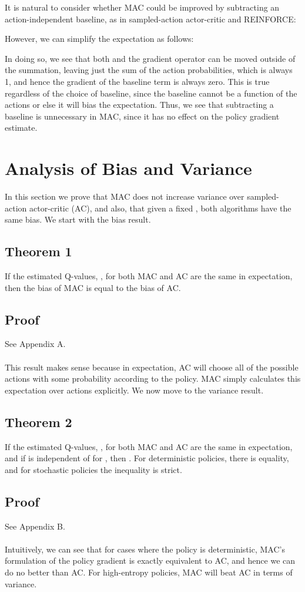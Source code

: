 \documentclass[letterpaper]{article}
\begin{document}
It is natural to consider whether MAC could be improved by subtracting an action-independent baseline, as in sampled-action actor-critic and REINFORCE:

However, we can simplify the expectation as follows:

In doing so, we see that both  and the gradient operator can be moved outside of the summation, leaving just the sum of the action probabilities, which is always 1, and hence the gradient of the baseline term is always zero. This is true regardless of the choice of baseline, since the baseline cannot be a function of the actions or else it will bias the expectation. Thus, we see that subtracting a baseline is unnecessary in MAC, since it has no effect on the policy gradient estimate.

\section{Analysis of Bias and Variance}
In this section we prove that MAC does not increase variance over sampled-action actor-critic (AC), and also, that given a fixed , both algorithms have the same bias. We start with the bias result.

\subsection{Theorem 1}
If the estimated Q-values, , for both MAC and AC are the same in expectation, then the bias of MAC is equal to the bias of AC.

\subsection{Proof}
See Appendix A.
\\
\\
This result makes sense because in expectation, AC will choose all of the possible actions with some probability according to the policy. MAC simply calculates this expectation over actions explicitly. We now move to the variance result.

\subsection{Theorem 2}
If the estimated Q-values, , for both MAC and AC are the same in expectation, and if  is independent of  for , then   . For deterministic policies, there is equality, and for stochastic policies the inequality is strict.
\subsection{Proof}
See Appendix B.
\\
\\
Intuitively, we can see that for cases where the policy is deterministic, MAC's formulation of the policy gradient is exactly equivalent to AC, and hence we can do no better than AC. For high-entropy policies, MAC will beat AC in terms of variance.
\end{document}
